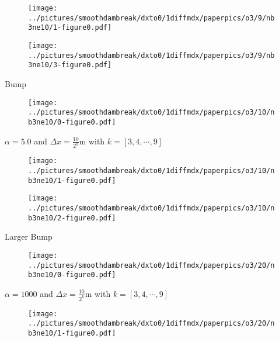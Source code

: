 \documentclass[pdf]{beamer}
\begin{document}
\begin{frame}{}
\begin{figure}
\texttt{[image: ../pictures/smoothdambreak/dxto0/1diffmdx/paperpics/o3/9/nb3ne10/1-figure0.pdf]}
\end{figure}
\cite{El-etal-2006}
\end{frame}

\begin{frame}{}
\begin{figure}
\texttt{[image: ../pictures/smoothdambreak/dxto0/1diffmdx/paperpics/o3/9/nb3ne10/3-figure0.pdf]}
\end{figure}
\end{frame}

\begin{frame}{Bump}
\begin{figure}
\texttt{[image: ../pictures/smoothdambreak/dxto0/1diffmdx/paperpics/o3/10/nb3ne10/0-figure0.pdf]}
\end{figure}
$\alpha = 5.0$ and $\Delta x = \frac{10}{2^k} \text{m}$ with $k = [3,4,\cdots,9]$
\end{frame}

\begin{frame}{}
\begin{figure}
\texttt{[image: ../pictures/smoothdambreak/dxto0/1diffmdx/paperpics/o3/10/nb3ne10/1-figure0.pdf]}
\end{figure}
\end{frame}

\begin{frame}{}
\begin{figure}
\texttt{[image: ../pictures/smoothdambreak/dxto0/1diffmdx/paperpics/o3/10/nb3ne10/2-figure0.pdf]}
\end{figure}
\end{frame}

\begin{frame}{Larger Bump}
\begin{figure}
\texttt{[image: ../pictures/smoothdambreak/dxto0/1diffmdx/paperpics/o3/20/nb3ne10/0-figure0.pdf]}
\end{figure}
$\alpha = 1000$ and $\Delta x = \frac{10}{2^k} \text{m}$ with $k = [3,4,\cdots,9]$
\end{frame}

\begin{frame}{}
\begin{figure}
\texttt{[image: ../pictures/smoothdambreak/dxto0/1diffmdx/paperpics/o3/20/nb3ne10/1-figure0.pdf]}
\end{figure}
\end{frame}
\end{document}
